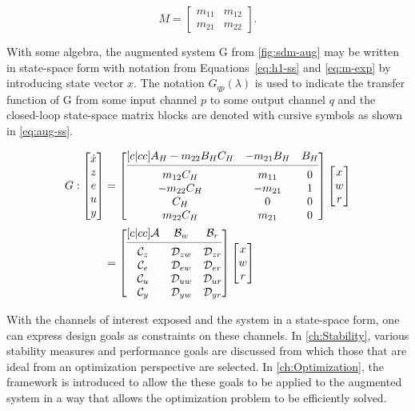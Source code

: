 \begin{equation}
	M = 
	\begin{bmatrix}
		m_{11} & m_{12} \\
		m_{21} & m_{22}
	\end{bmatrix}. \label{eq:m-exp}
\end{equation}

With some algebra, the augmented system \gls{G} from \autoref{fig:sdm-aug} may be written in state-space form with notation from Equations~\ref{eq:h1-ss} and \ref{eq:m-exp} by introducing state vector $x$. The notation $G_{qp}(\lambda)$ is used to indicate the transfer function of \gls{G} from some input channel $p$ to some output channel $q$ and the closed-loop state-space matrix blocks are denoted with cursive symbols as shown in \autoref{eq:aug-ss}.

\begin{align}
	G:
	\begin{bmatrix}
		\dot{x} \\
		z \\
		e \\
		u \\
		y
	\end{bmatrix} &=
	\begin{bmatrix}[c|cc]
		A_H - m_{22}B_HC_H & -m_{21}B_H & B_H \\
		\cmidrule(lr){1-3}
		m_{12}C_H & m_{11} & 0 \\
		-m_{22}C_H & -m_{21} & 1 \\
		C_H & 0 & 0 \\
		m_{22}C_H & m_{21} & 0
	\end{bmatrix}
	\begin{bmatrix}
		x \\
		w \\
		r
	\end{bmatrix} \label{eq:aug} \\
	&=
	\begin{bmatrix}[c|cc]
		\mathcal{A} & \mathcal{B}_w & \mathcal{B}_r \\
		\cmidrule(lr){1-3}
		\mathcal{C}_z & \mathcal{D}_{zw} & \mathcal{D}_{zr} \\
		\mathcal{C}_e & \mathcal{D}_{ew} & \mathcal{D}_{er} \\
		\mathcal{C}_u & \mathcal{D}_{uw} & \mathcal{D}_{ur} \\
		\mathcal{C}_y & \mathcal{D}_{yw} & \mathcal{D}_{yr}
	\end{bmatrix}
	\begin{bmatrix}
		x \\
		w \\
		r
	\end{bmatrix} \label{eq:aug-ss}
\end{align}

With the channels of interest exposed and the system in a state-space form, one can express design goals as constraints on these channels. In \autoref{ch:Stability}, various stability measures and performance goals are discussed from which those that are ideal from an optimization perspective are selected. In \autoref{ch:Optimization}, the framework is introduced to allow the these goals to be applied to the augmented system in a way that allows the optimization problem to be efficiently solved.